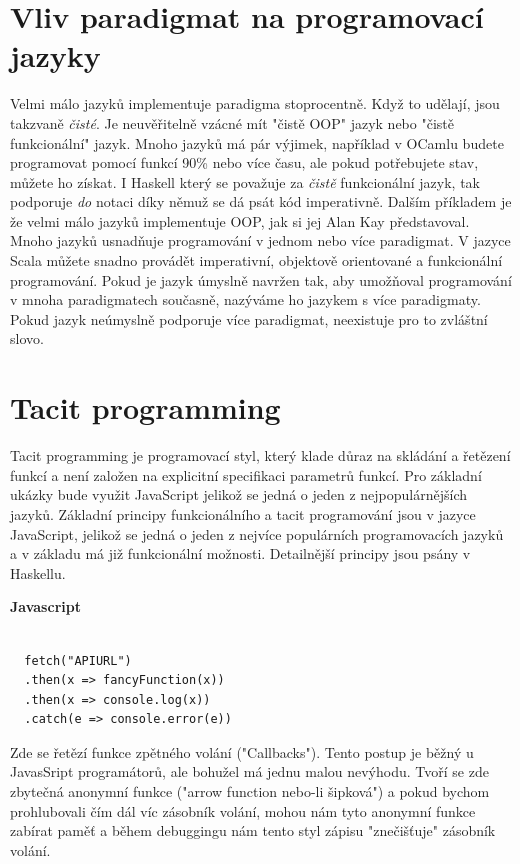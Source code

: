 \documentclass[male,czech]{kithesis}
\begin{document}
\section{Vliv paradigmat na programovací jazyky}
Velmi málo jazyků implementuje paradigma stoprocentně. 
Když to udělají, 
jsou takzvaně \textit{čisté}. 
Je neuvěřitelně vzácné mít "čistě OOP" jazyk nebo 
"čistě funkcionální" jazyk. 
Mnoho jazyků má pár výjimek, například v OCamlu budete programovat pomocí funkcí 90\% nebo 
více času, ale pokud potřebujete stav, můžete ho získat. 
I Haskell který se považuje za \textit{čistě} funkcionální jazyk,
tak podporuje \textit{do} notaci díky němuž se dá psát kód imperativně.
Dalším příkladem je že velmi málo jazyků implementuje OOP, 
jak si jej Alan Kay představoval.
Mnoho jazyků usnadňuje programování v jednom nebo více paradigmat. 
V jazyce Scala můžete snadno provádět imperativní, 
objektově orientované a funkcionální programování. 
Pokud je jazyk úmyslně navržen tak, 
aby umožňoval programování v mnoha paradigmatech současně, 
nazýváme ho jazykem s více paradigmaty. 
Pokud jazyk neúmyslně podporuje více paradigmat, 
neexistuje pro to zvláštní slovo.

\section{Tacit programming}

Tacit programming je programovací styl, 
který klade důraz na skládání a řetězení funkcí a není založen na explicitní specifikaci parametrů funkcí.
Pro základní ukázky bude využit JavaScript jelikož se jedná o jeden z nejpopulárnějších jazyků. 
Základní principy funkcionálního a tacit programování jsou v jazyce JavaScript,
jelikož se jedná o jeden z nejvíce populárních programovacích jazyků a v základu má již funkcionální možnosti.
Detailnější principy jsou psány v Haskellu.

\textbf{Javascript}
\begin{verbatim}

  fetch("APIURL")
  .then(x => fancyFunction(x))
  .then(x => console.log(x))
  .catch(e => console.error(e))

\end{verbatim}

Zde se řetězí funkce zpětného volání ("Callbacks"). 
Tento postup je běžný u JavasSript programátorů,
ale bohužel má jednu malou nevýhodu.
Tvoří se zde zbytečná anonymní funkce ("arrow function nebo-li šipková") 
a pokud bychom prohlubovali čím dál víc zásobník volání,
mohou nám tyto anonymní funkce zabírat paměť a 
během debuggingu nám tento styl zápisu "znečišťuje" 
zásobník volání. 
\end{document}
